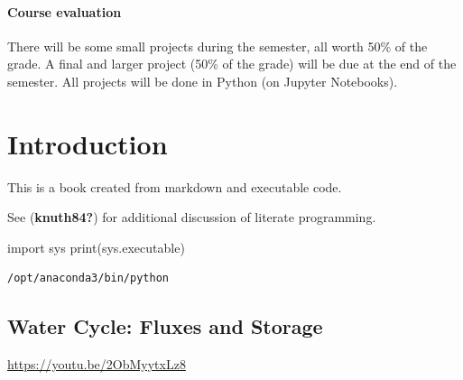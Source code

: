 \documentclass[
  letterpaper,
  DIV=11,
  numbers=noendperiod]{scrreprt}
\newenvironment{Shaded}{\begin{snugshade}}{\end{snugshade}}
\newcommand{\BuiltInTok}[1]{\textcolor[rgb]{0.00,0.23,0.31}{#1}}
\newcommand{\ImportTok}[1]{\textcolor[rgb]{0.00,0.46,0.62}{#1}}
\newcommand{\NormalTok}[1]{\textcolor[rgb]{0.00,0.23,0.31}{#1}}
\begin{document}
\hypertarget{course-evaluation}{%
\subsection*{Course evaluation}\label{course-evaluation}}

There will be some small projects during the semester, all worth 50\% of
the grade. A final and larger project (50\% of the grade) will be due at
the end of the semester. All projects will be done in Python (on Jupyter
Notebooks).

\part{Introduction}

This is a book created from markdown and executable code.

See (\textbf{knuth84?}) for additional discussion of literate
programming.

\begin{Shaded}
\begin{Highlighting}[]
\ImportTok{import}\NormalTok{ sys}
\BuiltInTok{print}\NormalTok{(sys.executable)}
\end{Highlighting}
\end{Shaded}

\begin{verbatim}
/opt/anaconda3/bin/python
\end{verbatim}

\hypertarget{water-cycle-fluxes-and-storage}{%
\chapter{Water Cycle: Fluxes and
Storage}\label{water-cycle-fluxes-and-storage}}

\url{https://youtu.be/2ObMyytxLz8}
\end{document}
